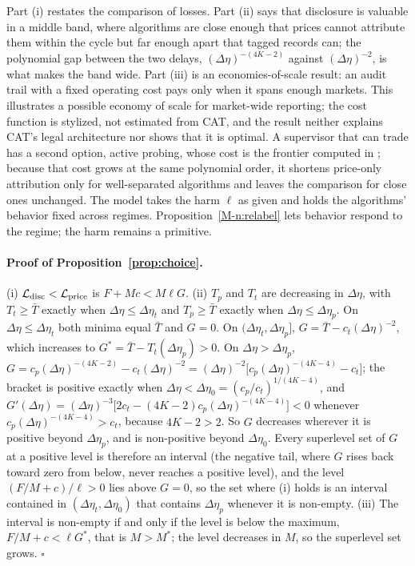 \documentclass[12pt]{article}
\theoremstyle{definition}
\theoremstyle{remark}
\begin{document}
Part (i) restates the comparison of losses. Part (ii) says that disclosure is valuable in a middle band, where algorithms are close enough that prices cannot attribute them within the cycle but far enough apart that tagged records can; the polynomial gap between the two delays, $(\Delta\eta)^{-(4K-2)}$ against $(\Delta\eta)^{-2}$, is what makes the band wide. Part (iii) is an economies-of-scale result: an audit trail with a fixed operating cost pays only when it spans enough markets. This illustrates a possible economy of scale for market-wide reporting; the cost function is stylized, not estimated from CAT, and the result neither explains CAT's legal architecture nor shows that it is optimal. A supervisor that can trade has a second option, active probing, whose cost is the frontier computed in \citet{niroula2026a}; because that cost grows at the same polynomial order, it shortens price-only attribution only for well-separated algorithms and leaves the comparison for close ones unchanged. The model takes the harm $\ell$ as given and holds the algorithms' behavior fixed across regimes. Proposition~\ref{M-n:relabel} lets behavior respond to the regime; the harm remains a primitive.

\paragraph{Proof of Proposition~\ref{prop:choice}.}
 (i) $\mathcal L_{\rm disc}<\mathcal L_{\rm price}$ is $F+Mc<M\ell G$. (ii) $T_p$ and $T_t$ are decreasing in $\Delta\eta$, with $T_t\ge\bar T$ exactly when $\Delta\eta\le\Delta\eta_t$ and $T_p\ge\bar T$ exactly when $\Delta\eta\le\Delta\eta_p$. On $\Delta\eta\le\Delta\eta_t$ both minima equal $\bar T$ and $G=0$. On $(\Delta\eta_t,\Delta\eta_p]$, $G=\bar T-c_t(\Delta\eta)^{-2}$, which increases to $G^*=\bar T-T_t(\Delta\eta_p)>0$. On $\Delta\eta>\Delta\eta_p$, $G=c_p(\Delta\eta)^{-(4K-2)}-c_t(\Delta\eta)^{-2}=(\Delta\eta)^{-2}\bigl[c_p(\Delta\eta)^{-(4K-4)}-c_t\bigr]$; the bracket is positive exactly when $\Delta\eta<\Delta\eta_0=(c_p/c_t)^{1/(4K-4)}$, and $G'(\Delta\eta)=(\Delta\eta)^{-3}\bigl[2c_t-(4K-2)c_p(\Delta\eta)^{-(4K-4)}\bigr]<0$ whenever $c_p(\Delta\eta)^{-(4K-4)}>c_t$, because $4K-2>2$. So $G$ decreases wherever it is positive beyond $\Delta\eta_p$, and is non-positive beyond $\Delta\eta_0$. Every superlevel set of $G$ at a positive level is therefore an interval (the negative tail, where $G$ rises back toward zero from below, never reaches a positive level), and the level $(F/M+c)/\ell>0$ lies above $G=0$, so the set where (i) holds is an interval contained in $(\Delta\eta_t,\Delta\eta_0)$ that contains $\Delta\eta_p$ whenever it is non-empty. (iii) The interval is non-empty if and only if the level is below the maximum, $F/M+c<\ell G^*$, that is $M>M^*$; the level decreases in $M$, so the superlevel set grows. $\square$
\end{document}
